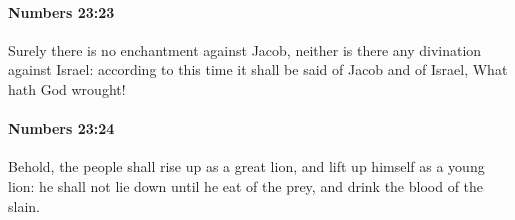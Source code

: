 		\paragraph{Numbers 23:23} %
			\label{NUMBERS-23-23}

			Surely there is no enchantment against Jacob, neither is there any divination against Israel: according to this time it shall be said of Jacob and of Israel, What hath God wrought!


		\paragraph{Numbers 23:24} %
			\label{NUMBERS-23-24}

			Behold, the people shall rise up as a great lion, and lift up himself as a young lion: he shall not lie down until he eat of the prey, and drink the blood of the slain.


